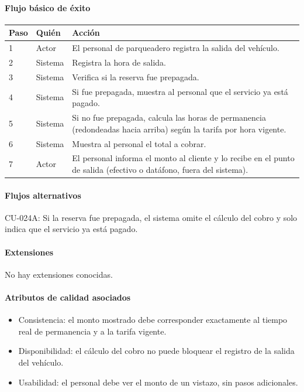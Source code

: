 \paragraph{Flujo básico de éxito}
\begin{longtable}{P{1.1cm}P{1.8cm}P{10.5cm}}
\toprule
\textbf{Paso} & \textbf{Quién} & \textbf{Acción}\\
\midrule
{} & Actor & El personal de parqueadero registra la salida del vehículo.\\
2 & Sistema & Registra la hora de salida.\\
3 & Sistema & Verifica si la reserva fue prepagada.\\
4 & Sistema & Si fue prepagada, muestra al personal que el servicio ya está pagado.\\
5 & Sistema & Si no fue prepagada, calcula las horas de permanencia (redondeadas hacia arriba) según la tarifa por hora vigente.\\
6 & Sistema & Muestra al personal el total a cobrar.\\
7 & Actor & El personal informa el monto al cliente y lo recibe en el punto de salida (efectivo o datáfono, fuera del sistema).\\
\bottomrule
\end{longtable}

\paragraph{Flujos alternativos}
CU-024A: Si la reserva fue prepagada, el sistema omite el cálculo del cobro y solo indica que el servicio ya está pagado.

\paragraph{Extensiones}
No hay extensiones conocidas.

\paragraph{Atributos de calidad asociados}
\begin{itemize}[leftmargin=1.4em, topsep=1pt]
  \item Consistencia: el monto mostrado debe corresponder exactamente al tiempo real de permanencia y a la tarifa vigente.
  \item Disponibilidad: el cálculo del cobro no puede bloquear el registro de la salida del vehículo.
  \item Usabilidad: el personal debe ver el monto de un vistazo, sin pasos adicionales.
\end{itemize}

